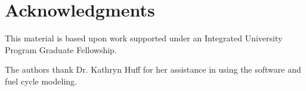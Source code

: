 \section{Acknowledgments}
This material is based upon work supported under an Integrated University Program Graduate
Fellowship.

The authors thank Dr. Kathryn Huff for her assistance 
in using the \Cyclus software and fuel cycle modeling. 